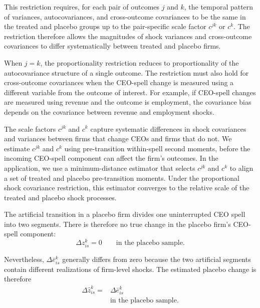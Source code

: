 \documentclass[sigconf,nonacm]{acmart}
\begin{document}
This restriction requires, for each pair of outcomes \(j\) and \(k\), the temporal pattern of variances, autocovariances, and cross-outcome covariances to be the same in the treated and placebo groups up to the pair-specific scale factor \(c^{jk}\) or \(c^{k}\). The restriction therefore allows the magnitudes of shock variances and cross-outcome covariances to differ systematically between treated and placebo firms.

When $j=k$, the proportionality restriction
reduces to proportionality of the autocovariance structure
of a single outcome. The restriction must also hold for
cross-outcome covariances when the CEO-spell change
is measured using a different variable from the
outcome of interest. For example, if CEO-spell changes
are measured using revenue and the outcome is employment,
the covariance bias depends on the covariance between
revenue and employment shocks. 

The scale factors $c^{jk}$ and $c^k$ capture systematic differences in
shock covariances and variances between firms that change CEOs and firms that do not. We
estimate $c^{jk}$ and $c^{k}$ using pre-transition within-spell second moments, before the incoming
CEO-spell component can affect the firm's outcomes. In the application,
we use a minimum-distance estimator that selects $c^{jk}$ and $c^{k}$ to align a set of
treated and placebo pre-transition moments. Under the proportional
shock covariance restriction, this estimator converges to the relative
scale of the treated and placebo shock processes.

The artificial transition in a placebo firm divides one uninterrupted
CEO spell into two segments. There is therefore no true change in the
placebo firm's CEO-spell component:
\begin{equation}
\Delta z_{is}^{k}=0
\qquad
\text{in the placebo sample}.
\label{eq:placebo_true_change}
\end{equation}

Nevertheless, $\Delta\bar e_{is}^{k}$ generally differs from zero because the two artificial segments contain different realizations of firm-level shocks. The estimated placebo change is therefore
\begin{align}
\Delta\widehat z_{is}^{k}
={}&
\Delta\bar e_{is}^{k}
\nonumber\\
&\text{in the placebo sample}.
\label{eq:placebo_estimated_change}
\end{align}
\end{document}
